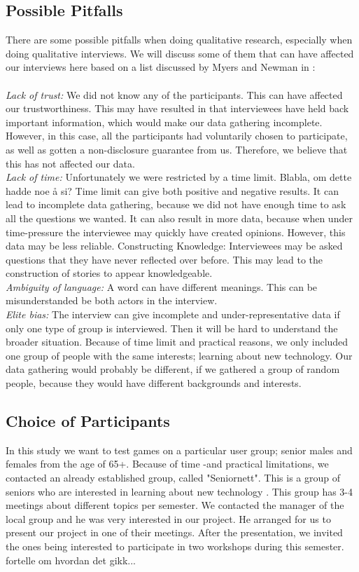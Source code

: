 \subsection{Possible Pitfalls}
There are some possible pitfalls when doing qualitative research, especially when doing qualitative interviews. We will discuss some of them that can have affected our interviews here based on a list discussed by Myers and Newman in \cite{interview}: \\ \\
\emph{Lack of trust:} We did not know any of the participants. This can have affected our trustworthiness. This may have resulted in that interviewees have held back important information, which would make our data gathering incomplete. However, in this case, all the participants had voluntarily chosen to participate, as well as gotten a non-disclosure guarantee from us. Therefore, we believe that this has not affected our data.\\
\emph{Lack of time:} Unfortunately we were restricted by a time limit. Blabla, om dette hadde noe å si? Time limit can give both positive and negative results. It can lead to incomplete data gathering, because we did not have enough time to ask all the questions we wanted. It can also result in more data, because when under time-pressure the interviewee may quickly have created opinions. However, this data may be less reliable. Constructing Knowledge: Interviewees may be asked questions that they have never reflected over before. This may lead to the construction of stories to appear knowledgeable. \\
\emph{Ambiguity of language:} A word can have different meanings. This can be misunderstanded be both actors in the interview. \\
\emph{Elite bias:} The interview can give incomplete and under-representative data if only one type of group is interviewed. Then it will be hard to understand the broader situation. Because of time limit and practical reasons, we only included one group of people with the same interests; learning about new technology. Our data gathering would probably be different, if we gathered a group of random people, because they would have different backgrounds and interests. 
\subsection{Choice of Participants}
In this study we want to test games on a particular user group; senior males and females from the age of 65+. Because of time -and practical limitations, we contacted an already established group, called "Seniornett". This is a group of seniors who are interested in learning about new technology \cite{seniornett}. This group has 3-4 meetings about different topics per semester. We contacted the manager of the local group and he was very interested in our project. He arranged for us to present our project in one of their meetings. After the presentation, we invited the ones being interested to participate in two workshops during this semester. fortelle om hvordan det gikk... 

